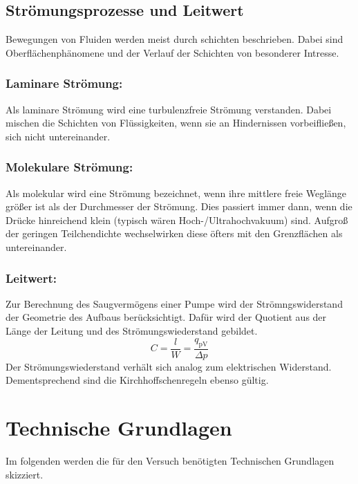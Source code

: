 \subsection{Strömungsprozesse und Leitwert}
Bewegungen von Fluiden werden meist durch schichten beschrieben. Dabei sind Oberflächenphänomene und der Verlauf der Schichten von besonderer Intresse.
\subsubsection{Laminare Strömung:}
Als laminare Strömung wird eine turbulenzfreie Strömung verstanden. Dabei mischen die Schichten von Flüssigkeiten, wenn sie an Hindernissen vorbeifließen, sich nicht untereinander.

\subsubsection{Molekulare Strömung:}
Als molekular wird eine Strömung bezeichnet, wenn ihre mittlere freie Weglänge größer ist als der Durchmesser der Strömung. Dies passiert immer dann, wenn die Drücke hinreichend klein (typisch wären Hoch-/Ultrahochvakuum) sind. Aufgroß der geringen Teilchendichte wechselwirken diese öfters mit den Grenzflächen als untereinander.

\subsubsection{Leitwert:}
Zur Berechnung des Saugvermögens einer Pumpe wird der Strömngswiderstand der Geometrie des Aufbaus berücksichtigt. Dafür wird der Quotient aus der Länge der Leitung und des Strömungswiederstand gebildet.
\begin{equation}
  C = \frac{l}{W} = \frac{q_\text{pV}}{\Delta p}
\end{equation}
Der Strömungswiederstand verhält sich analog zum elektrischen Widerstand. Dementsprechend sind die Kirchhoffschenregeln ebenso gültig. 

\section{Technische Grundlagen}
Im folgenden werden die für den Versuch benötigten Technischen Grundlagen skizziert.
